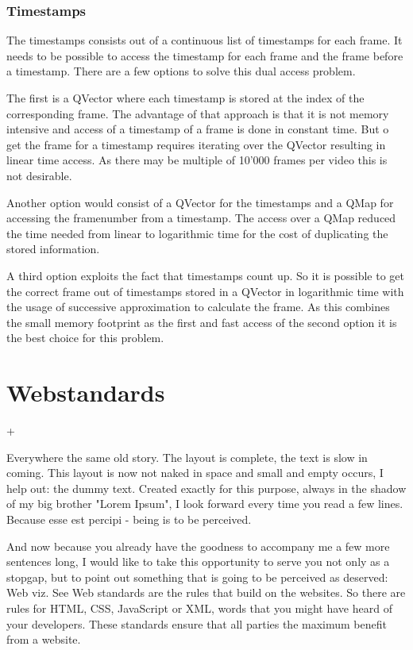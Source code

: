\subsubsection{Timestamps}
\label{sec:timestamps}
The timestamps consists out of a continuous list of timestamps for each frame. It needs to be possible to access the timestamp for each frame and the frame before a timestamp. There are a few options to solve this dual access problem. 

The first is a QVector where each timestamp is stored at the index of the corresponding frame. The advantage of that approach is that it is not memory intensive and access of a timestamp of a frame is done in constant time. But o get the frame for a timestamp requires iterating over the QVector resulting in linear time access. As there may be multiple of 10'000 frames per video this is not desirable. 

Another option would consist of a QVector for the timestamps and a QMap for accessing the framenumber from a timestamp. The access over a QMap reduced the time needed from linear to logarithmic time for the cost of duplicating the stored information. 

A third option exploits the fact that timestamps count up. So it is possible to get the correct frame out of timestamps stored in a QVector in logarithmic time with the usage of successive approximation to calculate the frame. As this combines the small memory footprint as the first and fast access of the second option it is the best choice for this problem.


\section{Webstandards}+
\label{sec:satzspiegeltest_webstandards}

Everywhere the same old story. The layout is complete, the text is slow in coming. This layout is now not naked in space and small and empty occurs, I help out: the dummy text. Created exactly for this purpose, always in the shadow of my big brother "Lorem Ipsum", I look forward every time you read a few lines. Because esse est percipi - being is to be perceived.

And now because you already have the goodness to accompany me a few more sentences long, I would like to take this opportunity to serve you not only as a stopgap, but to point out something that is going to be perceived as deserved: Web viz. See Web standards are the rules that build on the websites. So there are rules for HTML, CSS, JavaScript or XML, words that you might have heard of your developers. These standards ensure that all parties the maximum benefit from a website.


